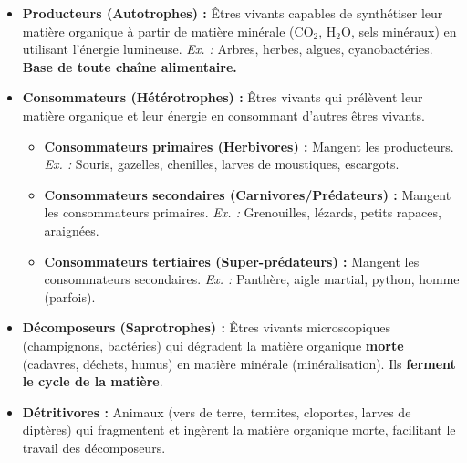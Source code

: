 \documentclass[11pt]{article}
\begin{document}
\begin{definition}
\begin{itemize}
    \item \textbf{Producteurs (Autotrophes) :} Êtres vivants capables de synthétiser leur matière organique à partir de matière minérale ($\text{CO}_2$, $\text{H}_2\text{O}$, sels minéraux) en utilisant l'énergie lumineuse. \emph{Ex. :} Arbres, herbes, algues, cyanobactéries. \textbf{Base de toute chaîne alimentaire.}
    \item \textbf{Consommateurs (Hétérotrophes) :} Êtres vivants qui prélèvent leur matière organique et leur énergie en consommant d'autres êtres vivants.
    \begin{itemize}
        \item \textbf{Consommateurs primaires (Herbivores) :} Mangent les producteurs. \emph{Ex. :} Souris, gazelles, chenilles, larves de moustiques, escargots.
        \item \textbf{Consommateurs secondaires (Carnivores/Prédateurs) :} Mangent les consommateurs primaires. \emph{Ex. :} Grenouilles, lézards, petits rapaces, araignées.
        \item \textbf{Consommateurs tertiaires (Super-prédateurs) :} Mangent les consommateurs secondaires. \emph{Ex. :} Panthère, aigle martial, python, homme (parfois).
    \end{itemize}
    \item \textbf{Décomposeurs (Saprotrophes) :} Êtres vivants microscopiques (champignons, bactéries) qui dégradent la matière organique \textbf{morte} (cadavres, déchets, humus) en matière minérale (minéralisation). Ils \textbf{ferment le cycle de la matière}.
    \item \textbf{Détritivores :} Animaux (vers de terre, termites, cloportes, larves de diptères) qui fragmentent et ingèrent la matière organique morte, facilitant le travail des décomposeurs.
\end{itemize}
\end{definition}
\end{document}
